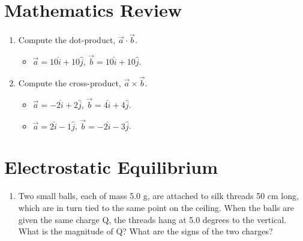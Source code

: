 \documentclass{article}
\begin{document}
\section{Mathematics Review}

\begin{enumerate}
\item Compute the dot-product, $\vec{a} \cdot \vec{b}$.
\begin{itemize}
\item $\vec{a} = 10\hat{i} + 10\hat{j}$, $\vec{b} = 10\hat{i} + 10\hat{j}$.
\end{itemize}
\item Compute the cross-product, $\vec{a} \times \vec{b}$.
\begin{itemize}
\item $\vec{a} = -2\hat{i} + 2\hat{j}$, $\vec{b} = 4\hat{i} + 4\hat{j}$.
\item $\vec{a} = 2\hat{i} - 1\hat{j}$, $\vec{b} = -2\hat{i} - 3\hat{j}$.
\end{itemize}
\end{enumerate} \vspace{4cm}

\section{Electrostatic Equilibrium}

\begin{enumerate}
\item Two small balls, each of mass 5.0 g, are attached to silk threads 50 cm long, which are in turn tied to the same point on the ceiling. When the balls are given the same charge Q, the threads hang at 5.0 degrees to the vertical. What is the magnitude of Q? What are the signs of the two charges?
\end{enumerate}
\end{document}
